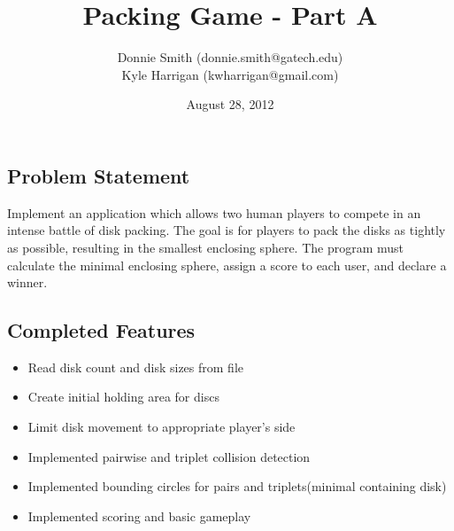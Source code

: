 \documentclass[a4paper]{article}
\title{Packing Game - Part A}
\author{
Donnie Smith (donnie.smith@gatech.edu) \\
Kyle Harrigan (kwharrigan@gmail.com) 
}
\date{August 28, 2012}                                           %
\begin{document}
\begingroup
\let\center\flushleft
\let\endcenter\endflushleft
\maketitle
\endgroup



 \subsection{Problem Statement}
  
Implement an application which allows two human players to compete in an intense battle of disk packing.  The goal is for players to pack the disks as tightly as possible, resulting in the smallest enclosing sphere.  The program must calculate the minimal enclosing sphere, assign a score to each user, and declare a winner.  
 
 \subsection{Completed Features}
 \begin{multicols}{2}
 \begin{itemize}
 \setlength\multicolsep{0pt}
\itemsep0em 
\item Read disk count and disk sizes from file
\item Create initial holding area for discs
\item Limit disk movement to appropriate player's side
\item Implemented pairwise and triplet collision detection
\item Implemented bounding circles for pairs and triplets(minimal containing disk)
\item Implemented scoring and basic gameplay
\end{itemize}
\end{multicols}
\end{document}
